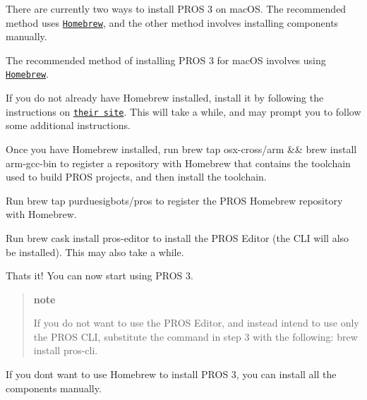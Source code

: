 There are currently two ways to install P\+R\+OS 3 on mac\+OS. The recommended method uses \href{https://brew.sh/}{\tt Homebrew}, and the other method involves installing components manually.

The recommended method of installing P\+R\+OS 3 for mac\+OS involves using \href{https://brew.sh/}{\tt Homebrew}.


\begin{DoxyEnumerate}
\item If you do not already have Homebrew installed, install it by following the instructions on \href{https://brew.sh}{\tt their site}. This will take a while, and may prompt you to follow some additional instructions.
\item Once you have Homebrew installed, run brew tap osx-\/cross/arm \&\& brew install arm-\/gcc-\/bin to register a repository with Homebrew that contains the toolchain used to build P\+R\+OS projects, and then install the toolchain.
\item Run brew tap purduesigbots/pros to register the P\+R\+OS Homebrew repository with Homebrew.
\item Run brew cask install pros-\/editor to install the P\+R\+OS Editor (the C\+LI will also be installed). This may also take a while.
\item That\textquotesingle{}s it! You can now start using P\+R\+OS 3.
\end{DoxyEnumerate}

\begin{quote}
{\bfseries note}

If you do not want to use the P\+R\+OS Editor, and instead intend to use only the P\+R\+OS C\+LI, substitute the command in step 3 with the following\+: brew install pros-\/cli. \end{quote}


If you don\textquotesingle{}t want to use Homebrew to install P\+R\+OS 3, you can install all the components manually.


